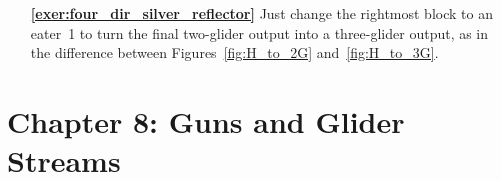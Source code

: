 \begin{multicols}{2}
\begin{itemize}[leftmargin=0em]
		
		\item[\bf\color{ocre}\sffamily\ref{exer:four_dir_silver_reflector}] Just change the rightmost block to an eater~1 to turn the final two-glider output into a three-glider output, as in the difference between Figures~\ref{fig:H_to_2G} and~\ref{fig:H_to_3G}.\\
	\end{itemize}
\end{multicols}



\hypertarget{solutions_glider_guns}{}\label{solutions_glider_guns}
\section*{Chapter 8: Guns and Glider Streams}
\renewcommand{\chapterfolder}{glider_guns/}

